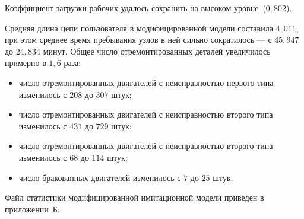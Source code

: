 \newpage

Коэффициент загрузки рабочих удалось сохранить на высоком уровне~($ 0{,}802 $).

Средняя длина цепи пользователя в модифицированной модели составила $ 4{,}011 $,
при этом среднее время пребывания узлов в ней сильно сократилось ---
с $ 45{,}947 $ до $ 24{,}834 $ минут.
Общее число отремонтированных деталей увеличилось примерно в $ 1{,}6 $ раза:
\begin{itemize}
  \item число отремонтированных двигателей с неисправностью первого типа изменилось
    с $ 208 $ до $ 307 $ штук;
  \item число отремонтированных двигателей с неисправностью второго типа изменилось
    с $ 431 $ до $ 729 $ штук;
  \item число отремонтированных двигателей с неисправностью второго типа изменилось
    с $ 68 $ до $ 114 $ штук;
  \item число бракованных двигателей изменилось с $ 7 $ до $ 25 $ штук.
\end{itemize}

Файл статистики модифицированной имитационной модели приведен в приложении~Б.


\pagebreak
